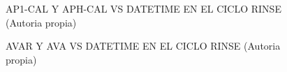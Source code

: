 \begin{figure}[H]
  \hfill
  \hfill
  \hfill
  \caption{AP1-CAL Y APH-CAL VS DATETIME EN EL CICLO RINSE (Autoria propia)}
  \end{figure}
\begin{figure}[H]
  \hfill
  \hfill
  \hfill
  \caption{AVAR Y AVA VS DATETIME EN EL CICLO RINSE (Autoria propia)}
  \end{figure}
